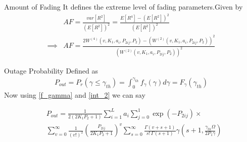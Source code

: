 \documentclass{beamer}
\begin{document}
\begin{frame}{}
    \begin{block}{Amount of Fading}
    It  defines  the  extreme  level  of  fading  parameters.Given by
    \begin{align}\nonumber
        &AF=\frac{var[R^2]}{(E[R^2])^2}=\frac{E[R^4] -(E[R^2])^2}{(E[R^2])^2} \\
        \implies& AF=\frac{2W^{(4)}(v,K_1,a_i,P_{2ij},P_2) - (W^{(2)}(v,K_1,a_i,P_{2ij},P_2))^2}{(W^{(2)}(v,K_1,a_i,P_{2ij},P_2))^2}
    \end{align}
    \end{block}
    \begin{block}{Outage Probability}
    Defined as 
    \begin{align}
        P_{out}=P_r(\gamma \leq \gamma_{th})=\int_0^{\gamma_{th}} f_{\gamma}(\gamma) d\gamma  =F_{\gamma} (\gamma_{th})
    \end{align}
    Now using \eqref{f_gamma} and \eqref{int_2} we can say
    \end{block}
\end{frame}
\begin{frame}{}
    \begin{block}{}
    \begin{align}
        &P_{out}=\frac{1}{2(2K_1P_2+1)} \sum_{i=1}^{L} a_i  \sum_{j=0}^{1} 
     \exp(-P_{2ij})  \times \label{Outage}\\ \nonumber
    &\sum_{v=0}^\infty \frac{1}{(v!)^2}\left(\frac{P_{2ij}}{2K_1P_2+1}\right)^v
    \sum_{s=0}^\infty  \frac{\Gamma(v+s+1)}{s!\,\Gamma(s+1)} \gamma\left(s+1,\frac{\gamma_{th} \Omega}{2P_1 \bar{\gamma}}\right)
    \end{align}
    \end{block}
\end{frame}
\end{document}
